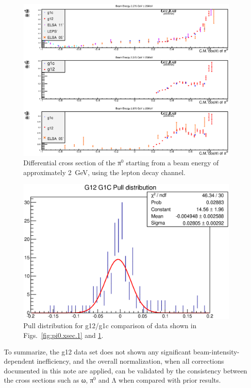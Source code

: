 \begin{figure}[htpb]
\includegraphics[width=0.95\columnwidth]{figures/xsec/G12_Pi0_XSection_forAnalysisNote_II.eps}
\caption{\label{fig:pi0.xsec.2}Differential cross section of the π$^0$ starting from a beam energy of approximately 2~GeV, using the lepton decay channel.}
\end{figure}

\begin{figure}[htpb]
\includegraphics[width=0.7\columnwidth]{figures/xsec/G12_Pi0_XSection_pull.eps}
\caption{\label{fig:pi0.xsec.pull}Pull distribution for g12/g1c comparison of data shown in Figs.~\ref{fig:pi0.xsec.1} and \ref{fig:pi0.xsec.2}.}
\end{figure}

To summarize, the g12 data set does not shown any significant beam-intensity-dependent inefficiency, and the overall normalization, when all corrections documented in this note are applied, can be validated by the consistency between the cross sections such as ω, π$^0$ and Λ when compared with prior results.
